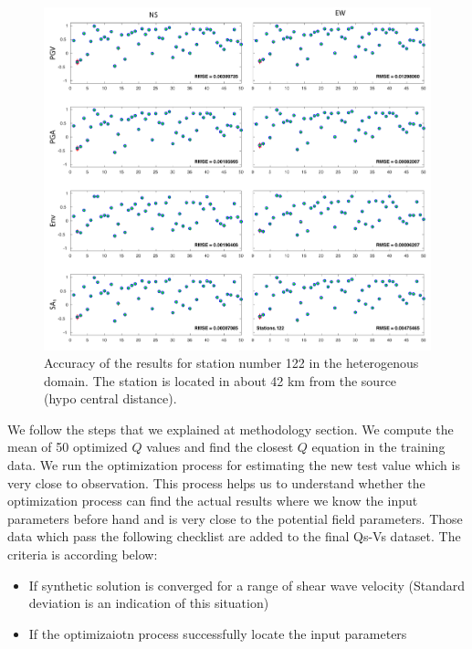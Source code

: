   \begin{figure}[ht]
    \centering
    \includegraphics[width=\textwidth]{figures/pdf/Figure_19-st122_het_sim_177.pdf}
    \caption{Accuracy of the results for station number 122 in the heterogenous domain. The station is located in about 42 km from the source (hypo central distance).  }
    \label{fig:ANN_accuracy_stations_122_heterogenous_sim_177}
\end{figure}
 
We follow the steps that we explained at methodology section. We compute the mean of 50 optimized $Q$ values and find the closest $Q$ equation in the training data. We run the optimization process for estimating the new test value which is very close to observation. This process helps us to understand whether the optimization process can find the actual results where we know the input parameters before hand and is very close to the potential field parameters. Those data which pass the following checklist are added to the final Qs-Vs dataset. The criteria is according below:

\begin{itemize}
\item If synthetic solution is converged for a range of shear wave velocity (Standard deviation is an indication of this situation)
\item If the optimizaiotn process successfully locate the input parameters
\end{itemize}

